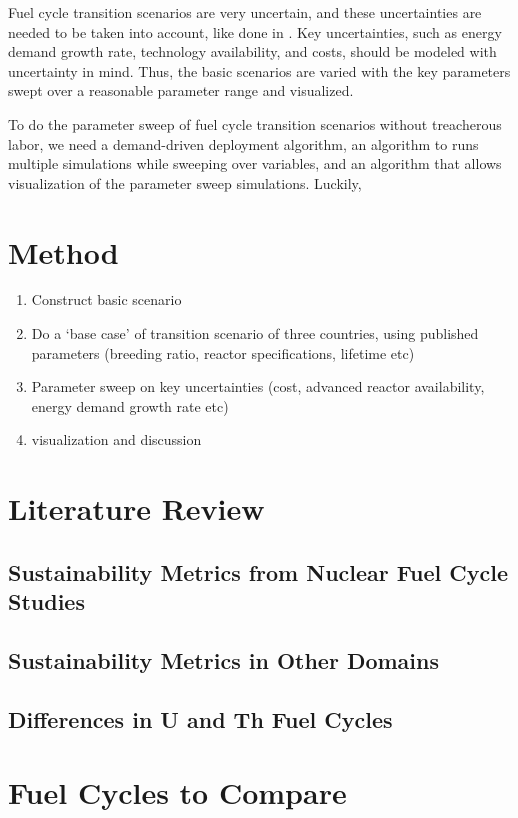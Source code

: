 \documentclass{article}
\begin{document}
Fuel cycle transition scenarios are very uncertain, and these uncertainties
are needed to be taken into account, like done in \cite{nuclear_phathanapirom_2016}. Key uncertainties, such as energy demand growth
rate, technology availability, and costs, should be modeled with uncertainty
in mind. Thus, the basic scenarios are varied with the key parameters
swept over a reasonable parameter range and visualized. 

To do the parameter sweep of fuel cycle transition scenarios without
treacherous labor, we need a demand-driven deployment algorithm,
an algorithm to runs multiple simulations while sweeping over
variables, and an algorithm that allows visualization of 
the parameter sweep simulations. Luckily, 






\section{Method}

\begin{enumerate}
\item Construct basic scenario
\item Do a `base case' of transition scenario of three countries, using published parameters (breeding ratio, reactor specifications, lifetime etc)
\item Parameter sweep on key uncertainties (cost, advanced reactor availability,
energy demand growth rate etc)
\item visualization and discussion
\end{enumerate}


\section{Literature Review}

\subsection{Sustainability Metrics from Nuclear Fuel Cycle Studies}

\subsection{Sustainability Metrics in Other Domains}

\subsection{Differences in U and Th Fuel Cycles}



%

\section{Fuel Cycles to Compare}



\end{document}
